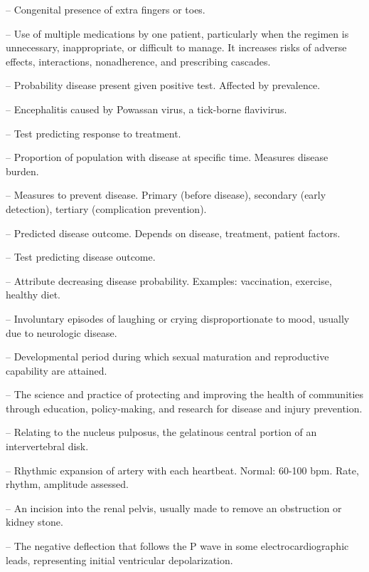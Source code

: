 -- Congenital presence of extra fingers or toes.

-- Use of multiple medications by one patient, particularly when the regimen is unnecessary, inappropriate, or difficult to manage. It increases risks of adverse effects, interactions, nonadherence, and prescribing cascades.

-- Probability disease present given positive test. Affected by prevalence.

-- Encephalitis caused by Powassan virus, a tick-borne flavivirus.

-- Test predicting response to treatment.

-- Proportion of population with disease at specific time. Measures disease burden.

-- Measures to prevent disease. Primary (before disease), secondary (early detection), tertiary (complication prevention).

-- Predicted disease outcome. Depends on disease, treatment, patient factors.

-- Test predicting disease outcome.

-- Attribute decreasing disease probability. Examples: vaccination, exercise, healthy diet.

-- Involuntary episodes of laughing or crying disproportionate to mood, usually due to neurologic disease.

-- Developmental period during which sexual maturation and reproductive capability are attained.

-- The science and practice of protecting and improving the health of communities through education, policy-making, and research for disease and injury prevention.

-- Relating to the nucleus pulposus, the gelatinous central portion of an intervertebral disk.

-- Rhythmic expansion of artery with each heartbeat. Normal: 60-100 bpm. Rate, rhythm, amplitude assessed.

-- An incision into the renal pelvis, usually made to remove an obstruction or kidney stone.

-- The negative deflection that follows the P wave in some electrocardiographic leads, representing initial ventricular depolarization.

